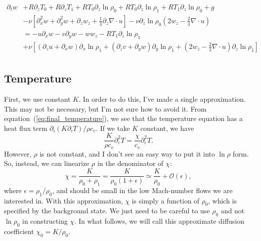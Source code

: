 \documentclass[letterpaper,12pt]{paper}
\newcommand{\lnrho}{\ensuremath{\ln \rho}}
\begin{document}
\begin{equation}
  \begin{aligned}
    \label{eq:ns_z_mfd}
    \partial_t w & + R \partial_z T_0 + R \partial_z T_1 + R
    T_0 \partial_z \lnrho_0 + R T_0 \partial_z \lnrho_1 + R
    T_1 \partial_z \lnrho_0 + g \\
&- \nu
    \left[ \partial_x^2 w + \partial_y^2 w + \partial_z w_z +
      \frac{1}{3} \partial_z \nabla \cdot u \right] - \nu \partial_z \lnrho_0 \left(2 w_z - \frac{2}{3} \nabla \cdot u  \right)  \\
    & = - u \partial_x w - v \partial_y w - w w_z - R T_1 \partial_z \lnrho_1 \\
    & + \nu \left[ (\partial_z u + \partial_x
      w)\partial_x \lnrho_1 + (\partial_z v + \partial_y w) \partial_y \lnrho_1  + \left( 2 w_z - \frac{2}{3} \nabla \cdot
        u\right) \partial_z \lnrho_1\right]\\
\end{aligned}
\end{equation}

\subsection{Temperature}
\label{sec:temp_mfd}

First, we use constant $K$. In order to do this, I've made a single
approximation. This may not be necessary, but I'm not sure how to
avoid it. From equation~(\ref{eq:final_temperature}), we see that the
temperature equation has a heat flux term $\partial_i (K \partial_i
T)/\rho c_v$. If we take $K$ constant, we have 
\begin{equation}
  \label{eq:const_K}
  \frac{K}{\rho c_v} \partial_i^2 T = \frac{\chi}{c_v} \partial_i^2 T.
\end{equation}
However, $\rho$ is not constant, and I don't see an easy way to put it
into $\lnrho$ form. So, instead, we can linearize $\rho$ in the
denominator of $\chi$:
\begin{equation}
  \label{eq:chi_expansion}
  \chi = \frac{K}{\rho_0 + \rho_1} = \frac{K}{\rho_0 (1 + \epsilon)}
  \simeq \frac{K}{\rho_0} + \mathcal{O}(\epsilon),
\end{equation}
where $\epsilon = \rho_1/\rho_0$, and should be small in the low
Mach-number flows we are interested in. With this approximation,
$\chi$ is simply a function of $\rho_0$, which is specified by the
background state. We just need to be careful to use $\rho_0$ and not
$\lnrho_0$ in constructing $\chi$. In what follows, we will call this approximate
diffusion coefficient $\chi_0 = K/\rho_0$.
\end{document}
